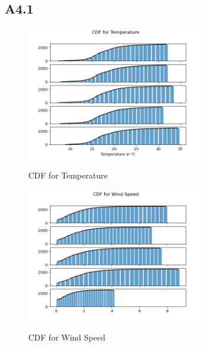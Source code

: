 \documentclass[a4paper,12pt]{article}
\begin{document}
 \subsection{A4.1}
   \begin{figure}[H] 
 	\centering
 	\includegraphics[width=0.7\textwidth]{CDF for Temperature.png}
 	\caption{CDF for Temperature}\cite{Maiullari2020}
   \end{figure}
   \begin{figure}[H] 
	\centering
	\includegraphics[width=0.7\textwidth]{CDF for Wind Speed.png}
    \caption{CDF for Wind Speed}\cite{Maiullari2020}
   \end{figure}
\end{document}
